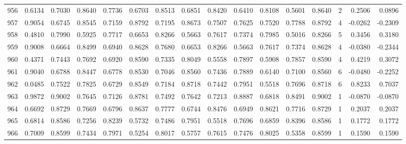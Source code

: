 \begin{tabular}{lrrrrrrrrrrrrrrr}
956 &      0.6134 &  0.7030 &  0.8640 &  0.7736 &  0.6703 &  0.8513 &  0.6851 &  0.8420 &  0.6410 &  0.8108 &   0.5601 &     0.8640 &      2 &                    0.2506 &                     0.0896 \\
957 &      0.9054 &  0.6745 &  0.8545 &  0.7159 &  0.8792 &  0.7195 &  0.8673 &  0.7507 &  0.7625 &  0.7520 &   0.7788 &     0.8792 &      4 &                   -0.0262 &                    -0.2309 \\
958 &      0.4810 &  0.7990 &  0.5925 &  0.7717 &  0.6653 &  0.8266 &  0.5663 &  0.7617 &  0.7374 &  0.7985 &   0.5016 &     0.8266 &      5 &                    0.3456 &                     0.3180 \\
959 &      0.9008 &  0.6664 &  0.8499 &  0.6940 &  0.8628 &  0.7680 &  0.6653 &  0.8266 &  0.5663 &  0.7617 &   0.7374 &     0.8628 &      4 &                   -0.0380 &                    -0.2344 \\
960 &      0.4371 &  0.7443 &  0.7692 &  0.6920 &  0.8590 &  0.7335 &  0.8049 &  0.5558 &  0.7897 &  0.5908 &   0.7857 &     0.8590 &      4 &                    0.4219 &                     0.3072 \\
961 &      0.9040 &  0.6788 &  0.8447 &  0.6778 &  0.8530 &  0.7046 &  0.8560 &  0.7436 &  0.7889 &  0.6140 &   0.7100 &     0.8560 &      6 &                   -0.0480 &                    -0.2252 \\
962 &      0.0485 &  0.7522 &  0.7825 &  0.6729 &  0.8549 &  0.7184 &  0.8718 &  0.7442 &  0.7951 &  0.5518 &   0.7696 &     0.8718 &      6 &                    0.8233 &                     0.7037 \\
963 &      0.9872 &  0.9002 &  0.7645 &  0.7126 &  0.8781 &  0.7492 &  0.7642 &  0.7213 &  0.8887 &  0.6818 &   0.8491 &     0.9002 &      1 &                   -0.0870 &                    -0.0870 \\
964 &      0.6692 &  0.8729 &  0.7669 &  0.6796 &  0.8637 &  0.7777 &  0.6744 &  0.8476 &  0.6949 &  0.8621 &   0.7716 &     0.8729 &      1 &                    0.2037 &                     0.2037 \\
965 &      0.6814 &  0.8586 &  0.7256 &  0.8239 &  0.5732 &  0.7486 &  0.7951 &  0.5518 &  0.7696 &  0.6859 &   0.8396 &     0.8586 &      1 &                    0.1772 &                     0.1772 \\
966 &      0.7009 &  0.8599 &  0.7434 &  0.7971 &  0.5254 &  0.8017 &  0.5757 &  0.7615 &  0.7476 &  0.8025 &   0.5358 &     0.8599 &      1 &                    0.1590 &                     0.1590 \\

\end{tabular}
